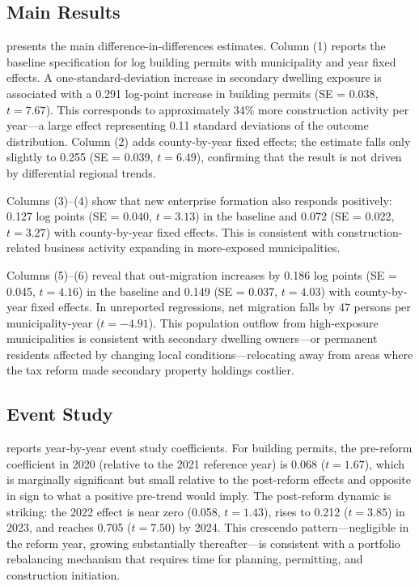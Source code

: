\documentclass[12pt]{article}
\begin{document}
\subsection{Main Results}

 presents the main difference-in-differences estimates. Column (1) reports the baseline specification for log building permits with municipality and year fixed effects. A one-standard-deviation increase in secondary dwelling exposure is associated with a 0.291 log-point increase in building permits (SE = 0.038, $t = 7.67$). This corresponds to approximately 34\% more construction activity per year---a large effect representing 0.11 standard deviations of the outcome distribution. Column (2) adds county-by-year fixed effects; the estimate falls only slightly to 0.255 (SE = 0.039, $t = 6.49$), confirming that the result is not driven by differential regional trends.

Columns (3)--(4) show that new enterprise formation also responds positively: 0.127 log points (SE = 0.040, $t = 3.13$) in the baseline and 0.072 (SE = 0.022, $t = 3.27$) with county-by-year fixed effects. This is consistent with construction-related business activity expanding in more-exposed municipalities.

Columns (5)--(6) reveal that out-migration increases by 0.186 log points (SE = 0.045, $t = 4.16$) in the baseline and 0.149 (SE = 0.037, $t = 4.03$) with county-by-year fixed effects. In unreported regressions, net migration falls by 47 persons per municipality-year ($t = -4.91$). This population outflow from high-exposure municipalities is consistent with secondary dwelling owners---or permanent residents affected by changing local conditions---relocating away from areas where the tax reform made secondary property holdings costlier.



\subsection{Event Study}

 reports year-by-year event study coefficients. For building permits, the pre-reform coefficient in 2020 (relative to the 2021 reference year) is 0.068 ($t = 1.67$), which is marginally significant but small relative to the post-reform effects and opposite in sign to what a positive pre-trend would imply. The post-reform dynamic is striking: the 2022 effect is near zero (0.058, $t = 1.43$), rises to 0.212 ($t = 3.85$) in 2023, and reaches 0.705 ($t = 7.50$) by 2024. This crescendo pattern---negligible in the reform year, growing substantially thereafter---is consistent with a portfolio rebalancing mechanism that requires time for planning, permitting, and construction initiation.
\end{document}
